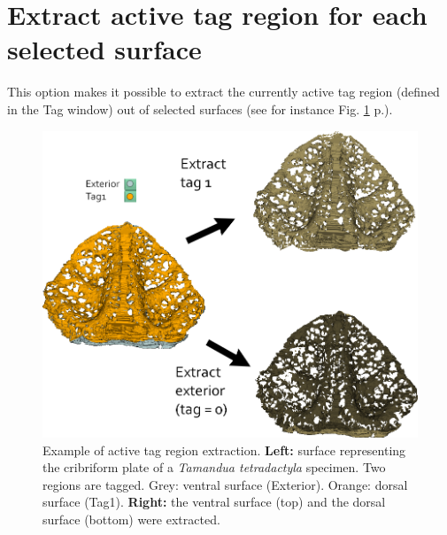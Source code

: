 \section{Extract active tag region for each selected surface}\label{extract_active_tag_section}
This option makes it possible to extract the currently active tag region (defined in the Tag window) out of selected surfaces (see for instance Fig. \ref{extract_active_tag} p.\pageref{extract_active_tag}).
\begin{figure}
  \centering
  \includegraphics[scale=0.5]{images/12/extract_active_tag.png} 
	\caption{Example of active tag region extraction. \textbf{Left:} surface representing the cribriform plate of a \textit{Tamandua tetradactyla} specimen. Two regions are tagged. Grey: ventral surface (Exterior). Orange: dorsal surface (Tag1).  \textbf{Right:} the ventral surface (top) and the dorsal surface (bottom) were extracted. }
\label{extract_active_tag}
 
\end{figure}

